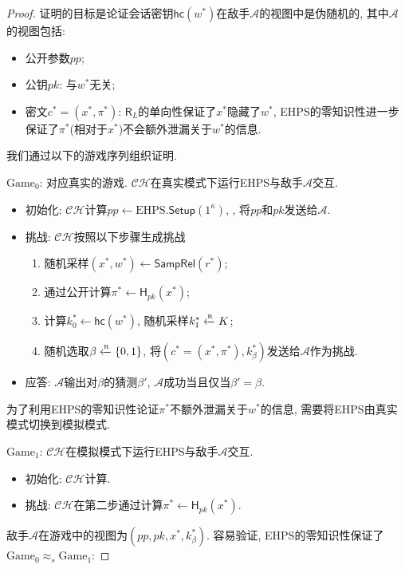 \begin{proof}
证明的目标是论证会话密钥$\mathsf{hc}(w^*)$在敌手$\mathcal{A}$的视图中是伪随机的, 其中$\mathcal{A}$的视图包括: 

\begin{itemize}
	\item 公开参数$pp$; 
	\item 公钥$pk$: 与$w^*$无关; 
    \item 密文$c^* = (x^*, \pi^*)$: $\mathsf{R}_L$的单向性保证了$x^*$隐藏了$w^*$, 
    	EHPS的零知识性进一步保证了$\pi^*$(相对于$x^*$)不会额外泄漏关于$w^*$的信息. 
\end{itemize}

我们通过以下的游戏序列组织证明.
\begin{trivlist}
\item $\text{Game}_0$: 对应真实的游戏. $\mathcal{CH}$在真实模式下运行EHPS与敌手$\mathcal{A}$交互.
\begin{itemize}
\item 初始化: $\mathcal{CH}$计算$pp \leftarrow \text{EHPS}.\mathsf{Setup}(1^\kappa)$, 
	, 将$pp$和$pk$发送给$\mathcal{A}$. 
        
\item 挑战: $\mathcal{CH}$按照以下步骤生成挑战 
\begin{enumerate}
    \item 随机采样$(x^*, w^*) \leftarrow \mathsf{SampRel}(r^*)$;  
    \item 通过公开计算$\pi^* \leftarrow \mathsf{H}_{pk}(x^*)$; 
    \item 计算$k_0^* \leftarrow \mathsf{hc}(w^*)$, 随机采样$k_1^* \xleftarrow{\textup{\tiny R}} K$; 
    \item 随机选取$\beta \xleftarrow{\textup{\tiny R}} \{0,1\}$, 将$(c^* = (x^*, \pi^*), k_\beta^*)$发送给$\mathcal{A}$作为挑战. 
\end{enumerate}

\item 应答: $\mathcal{A}$输出对$\beta$的猜测$\beta'$, $\mathcal{A}$成功当且仅当$\beta' = \beta$. 
\end{itemize}

为了利用EHPS的零知识性论证$\pi^*$不额外泄漏关于$w^*$的信息, 需要将EHPS由真实模式切换到模拟模式. 
\item $\text{Game}_1$: $\mathcal{CH}$在模拟模式下运行EHPS与敌手$\mathcal{A}$交互. 
\begin{itemize}
\item 初始化: $\mathcal{CH}$计算. 
\item 挑战: $\mathcal{CH}$在第二步通过计算$\pi^* \leftarrow \mathsf{H}_{pk}(x^*)$.
\end{itemize}
\end{trivlist}
敌手$\mathcal{A}$在游戏中的视图为$(pp, pk, x^*, k_\beta^*)$. 容易验证, EHPS的零知识性保证了$\text{Game}_0 \approx_s \text{Game}_1$: 



\end{proof}
